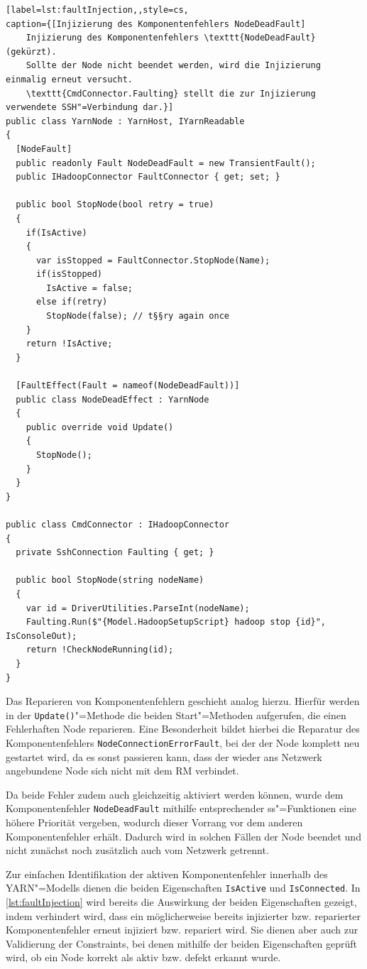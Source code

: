 \begin{lstlisting}[label=lst:faultInjection,,style=cs,
caption={[Injizierung des Komponentenfehlers NodeDeadFault]
    Injizierung des Komponentenfehlers \texttt{NodeDeadFault} (gekürzt).
    Sollte der Node nicht beendet werden, wird die Injizierung einmalig erneut versucht.
    \texttt{CmdConnector.Faulting} stellt die zur Injizierung verwendete SSH"=Verbindung dar.}]
public class YarnNode : YarnHost, IYarnReadable
{
  [NodeFault]
  public readonly Fault NodeDeadFault = new TransientFault();
  public IHadoopConnector FaultConnector { get; set; }
  
  public bool StopNode(bool retry = true)
  {
    if(IsActive)
    {
      var isStopped = FaultConnector.StopNode(Name);
      if(isStopped)
        IsActive = false;
      else if(retry)
        StopNode(false); // t§§ry again once
    }
    return !IsActive;
  }
  
  [FaultEffect(Fault = nameof(NodeDeadFault))]
  public class NodeDeadEffect : YarnNode
  {
    public override void Update()
    {
      StopNode();
    }
  }
}

public class CmdConnector : IHadoopConnector
{
  private SshConnection Faulting { get; }
  
  public bool StopNode(string nodeName)
  {
    var id = DriverUtilities.ParseInt(nodeName);
    Faulting.Run($"{Model.HadoopSetupScript} hadoop stop {id}", IsConsoleOut);
    return !CheckNodeRunning(id);
  }
}
\end{lstlisting}

Das Reparieren von Komponentenfehlern geschieht analog hierzu.
Hierfür werden in der \texttt{Update()}"=Methode die beiden Start"=Methoden aufgerufen, die einen Fehlerhaften Node reparieren.
Eine Besonderheit bildet hierbei die Reparatur des Komponentenfehlers \texttt{NodeConnectionErrorFault}, bei der der Node komplett neu gestartet wird, da es sonst passieren kann, dass der wieder ans Netzwerk angebundene Node sich nicht mit dem \gls{RM} verbindet.

Da beide Fehler zudem auch gleichzeitig aktiviert werden können, wurde dem Komponentenfehler \texttt{NodeDeadFault} mithilfe entsprechender \gls{ss}"=Funktionen eine höhere Priorität vergeben, wodurch dieser Vorrang vor dem anderen Komponentenfehler erhält.
Dadurch wird in solchen Fällen der Node beendet und nicht zunächst noch zusätzlich auch vom Netzwerk getrennt.

Zur einfachen Identifikation der aktiven Komponentenfehler innerhalb des \gls{YARN}"=Modells dienen die beiden Eigenschaften \texttt{IsActive} und \texttt{IsConnected}.
In \cref{lst:faultInjection} wird bereits die Auswirkung der beiden Eigenschaften gezeigt, indem verhindert wird, dass ein möglicherweise bereits injizierter bzw. reparierter Komponentenfehler erneut injiziert bzw. repariert wird.
Sie dienen aber auch zur Validierung der Constraints, bei denen mithilfe der beiden Eigenschaften geprüft wird, ob ein Node korrekt als aktiv bzw. defekt erkannt wurde.

